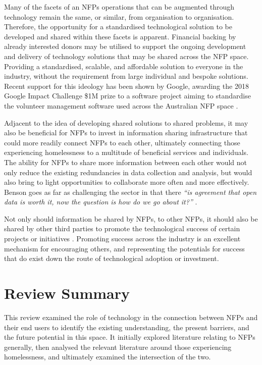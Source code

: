 Many of the facets of an NFPs operations that can be augmented through technology remain the same, or similar, from organisation to organisation. Therefore, the opportunity for a standardised technological solution to be developed and shared within these facets is apparent. Financial backing by already interested donors may be utilised to support the ongoing development and delivery of technology solutions that may be shared across the NFP space. Providing a standardised, scalable, and affordable solution to everyone in the industry, without the requirement from large individual and bespoke solutions. Recent support for this ideology has been shown by Google, awarding the 2018 Google Impact Challenge \$1M prize to a software project aiming to standardise the volunteer management software used across the Australian NFP space \cite{osa2018}.

Adjacent to the idea of developing shared solutions to shared problems, it may also be beneficial for NFPs to invest in information sharing infrastructure that could more readily connect NFPs to each other, ultimately connecting those experiencing homelessness to a multitude of beneficial services and individuals. The ability for NFPs to share more information between each other would not only reduce the existing redundancies in data collection and analysis, but would also bring to light opportunities to collaborate more often and more effectively. Benson goes as far as challenging the sector in that there \emph{“is agreement that open data is worth it, now the question is how do we go about it?”} \cite{van2015open}.

Not only should information be shared by NFPs, to other NFPs, it should also be shared by other third parties to promote the technological success of certain projects or initiatives \cite{van2015open}. Promoting success across the industry is an excellent mechanism for encouraging others, and representing the potentials for success that do exist down the route of technological adoption or investment.

\section{Review Summary}

This review examined the role of technology in the connection between NFPs and their end users to identify the existing understanding, the present barriers, and the future potential in this space. It initially explored literature relating to NFPs generally, then analysed the relevant literature around those experiencing homelessness, and ultimately examined the intersection of the two.

